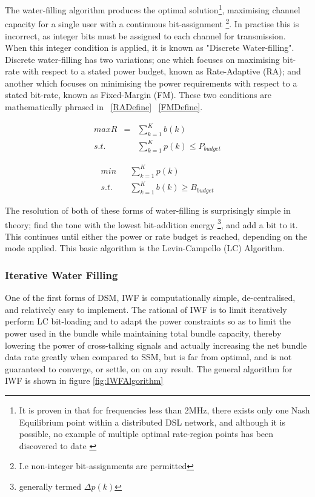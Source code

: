 The water-filling algorithm produces the optimal solution\footnote{It is proven in \cite{STC03} that for frequencies less than 2MHz, there exists only one Nash Equilibrium point within a distributed DSL network, and although it is possible, no example of multiple optimal rate-region points has been discovered to date \cite{STC07}}, maximising channel capacity for a single user with a continuous bit-assignment \footnote{I.e non-integer bit-assignments are permitted}. In practise this is incorrect, as integer bits must be assigned to each channel for transmission. When this integer condition is applied, it is known as "Discrete Water-filling". Discrete water-filling has two variations; one which focuses on maximising bit-rate with respect to a stated power budget, known as Rate-Adaptive (RA); and another which focuses on minimising the power requirements with respect to a stated bit-rate, known as Fixed-Margin (FM). These two conditions are mathematically phrased in ~\eqref{RADefine} ~\eqref{FMDefine}\cite{TS99}.

\begin{equation}
  \begin{array}{rcl}
  max R&=&\sum_{k=1}^Kb(k)\\
  s.t.&&\sum\limits_{k=1}^Kp(k)\leq P_{budget}
  \end{array}
\label{FMDefine}
\end{equation}

\begin{equation}
  \begin{array}{rcl}
  min &&\sum\limits_{k=1}^Kp(k)\\
  s.t.&&\sum\limits_{k=1}^Kb(k)\geq B_{budget}
  \end{array}
\label{RADefine}
\end{equation}

The resolution of both of these forms of water-filling is surprisingly simple in theory; find the tone with the lowest bit-addition energy \footnote{generally termed \(\Delta p(k)\)}, and add a bit to it. This continues until either the power or rate budget is reached, depending on the mode applied. This basic algorithm is the Levin-Campello (LC) Algorithm\cite{H.L01}.

\subsubsection{Iterative Water Filling}
One of the first forms of DSM, IWF is computationally simple, de-centralised, and relatively easy to implement.
The rational of IWF is to limit iteratively perform LC bit-loading and to adapt the power constraints so as to limit the power used in the bundle while maintaining total bundle capacity, thereby lowering the power of cross-talking signals and actually increasing the net bundle data rate greatly when compared to SSM, but is far from optimal, and is not guaranteed to converge, or settle, on on any result. The general algorithm for IWF is shown in figure \ref{fig:IWFAlgorithm}

